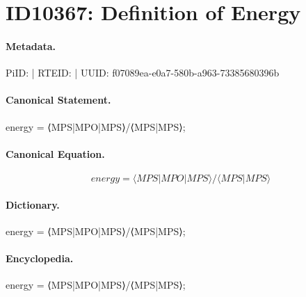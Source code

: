 \section*{ID10367: Definition of Energy}
\paragraph{Metadata.}
PiID:  | RTEID:  | UUID: f07089ea-e0a7-580b-a963-73385680396b

\paragraph{Canonical Statement.}
energy = ⟨MPS|MPO|MPS⟩/⟨MPS|MPS⟩;

\paragraph{Canonical Equation.}
\[
energy = ⟨MPS|MPO|MPS⟩/⟨MPS|MPS⟩
\]

\paragraph{Dictionary.}
energy = ⟨MPS|MPO|MPS⟩/⟨MPS|MPS⟩;

\paragraph{Encyclopedia.}
energy = ⟨MPS|MPO|MPS⟩/⟨MPS|MPS⟩;
